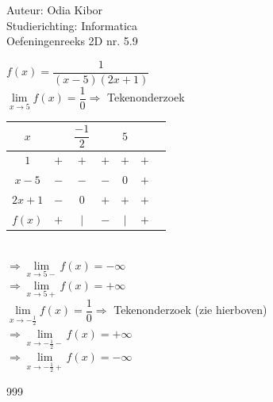 \documentclass[a4paper]{article}
\begin{document}
  
\noindent \large Auteur: Odia Kibor \\
\noindent \large Studierichting: Informatica\\
\noindent \large Oefeningenreeks 2D nr. 5.9\\

\medskip

\normalsize

$ f(x) = \dfrac{1}{(x - 5)(2x + 1)}$ \\

$\lim\limits_{x \rightarrow 5} f(x) = \dfrac{1}{0} \Rightarrow $ Tekenonderzoek \\

\begin{tabular}{c|cccccc}
$x$     &      &  $\dfrac{-1}{2}$ &       &  $5$  &     \\ \hline
$1$     & $+$  &  $+$  &  $+$     &  $+$  & $+$ \\
$x-5$   & $-$  &  $-$  &  $-$     &  $0$  & $+$ \\
$2x+1$  & $-$  &  $0$  &  $+$     &  $+$  & $+$ \\ \hline
$f(x)$  & $+$  &  $|$  &  $-$     &  $|$  & $+$ \\
\end{tabular}\\

$\Rightarrow \lim\limits_{x \rightarrow 5-} f(x) = -\infty$ \\

$\Rightarrow \lim\limits_{x \rightarrow 5+} f(x) = +\infty$ \\

$\lim\limits_{x \rightarrow -\tfrac{1}{2}} f(x) = \dfrac{1}{0} \Rightarrow $ Tekenonderzoek (zie hierboven)\\

$\Rightarrow \lim\limits_{x \rightarrow -\tfrac{1}{2}-} f(x) = +\infty$ \\

$\Rightarrow \lim\limits_{x \rightarrow -\tfrac{1}{2}+} f(x) = -\infty$ \\










\begin{thebibliography}{999}
\end{thebibliography}
\end{document}
